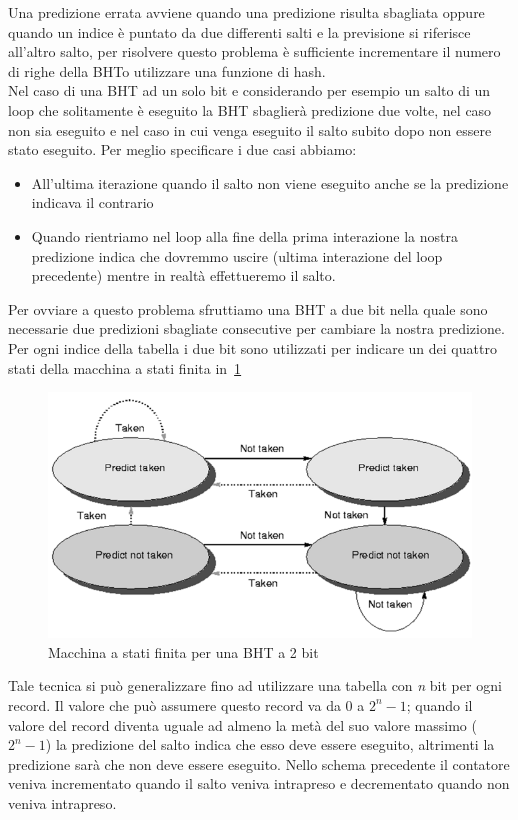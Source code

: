 Una predizione errata avviene quando una predizione risulta sbagliata oppure quando un indice è puntato da due differenti salti e la previsione si riferisce all'altro salto, per risolvere questo problema è sufficiente incrementare il numero di righe della BHTo utilizzare una funzione di hash.\\
Nel caso di una BHT ad un solo bit e considerando per esempio un salto di un loop che solitamente è eseguito la BHT sbaglierà predizione due volte, nel caso non sia eseguito e nel caso in cui venga eseguito il salto subito dopo non essere stato eseguito. Per meglio specificare i due casi abbiamo:
\begin{itemize}
\item All'ultima iterazione quando il salto non viene eseguito anche se la predizione indicava il contrario
\item Quando rientriamo nel loop alla fine della prima interazione la nostra predizione indica che dovremmo uscire (ultima interazione del loop precedente) mentre in realtà effettueremo il salto. 
\end{itemize}
Per ovviare a questo problema sfruttiamo una BHT a due bit nella quale sono necessarie due predizioni sbagliate consecutive per cambiare la nostra predizione. Per ogni indice della tabella i due bit sono utilizzati per indicare un dei quattro stati della macchina a stati finita in \figurename\,\ref{fig:bhtfsm}
\begin{figure}[htb]
\centering
\includegraphics[scale=0.4]{img/bhtfsm.png}
\caption{Macchina a stati finita per una BHT a 2 bit}\label{fig:bhtfsm}
\end{figure}
Tale tecnica si può generalizzare fino ad utilizzare una tabella con \emph{n} bit per ogni record. Il valore che può assumere questo record va da 0 a $2^n-1$; quando il valore del record diventa uguale ad almeno la metà del suo valore massimo ($2^n-1$) la predizione del salto indica che esso deve essere eseguito, altrimenti la predizione sarà che non deve essere eseguito. Nello schema precedente il contatore veniva incrementato quando il salto veniva intrapreso e decrementato quando non veniva intrapreso.
